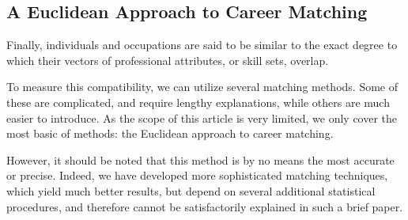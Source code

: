 \documentclass{article}
\begin{document}



\subsection{A Euclidean Approach to Career Matching}
Finally, individuals and occupations are said to be similar to the exact degree to which their vectors of professional attributes, or skill sets, overlap.

To measure this compatibility, we can utilize several matching methods. Some of these are complicated, and require lengthy explanations, while others are much easier to introduce. As the scope of this article is very limited, we only cover the most basic of methods: the Euclidean approach to career matching.

However, it should be noted that this method is by no means the most accurate or precise. Indeed, we have developed more sophisticated matching techniques, which yield much better results, but depend on several additional statistical procedures, and therefore cannot be satisfactorily explained in such a brief paper.
\end{document}

